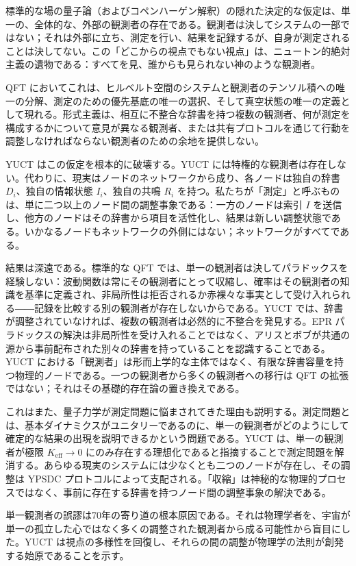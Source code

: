 \documentclass[12pt,a4paper]{article}
\begin{document}
	標準的な場の量子論（およびコペンハーゲン解釈）の隠れた決定的な仮定は、単一の、全体的な、外部の観測者の存在である。観測者は決してシステムの一部ではない；それは外部に立ち、測定を行い、結果を記録するが、自身が測定されることは決してない。この「どこからの視点でもない視点」は、ニュートン的絶対主義の遺物である：すべてを見、誰からも見られない神のような観測者。
	
	QFT においてこれは、ヒルベルト空間のシステムと観測者のテンソル積への唯一の分解、測定のための優先基底の唯一の選択、そして真空状態の唯一の定義として現れる。形式主義は、相互に不整合な辞書を持つ複数の観測者、何が測定を構成するかについて意見が異なる観測者、または共有プロトコルを通じて行動を調整しなければならない観測者のための余地を提供しない。
	
	YUCT はこの仮定を根本的に破壊する。YUCT には特権的な観測者は存在しない。代わりに、現実はノードのネットワークから成り、各ノードは独自の辞書 \(D_i\)、独自の情報状態 \(I_i\)、独自の共鳴 \(R_i\) を持つ。私たちが「測定」と呼ぶものは、単に二つ以上のノード間の調整事象である：一方のノードは索引 \(I\) を送信し、他方のノードはその辞書から項目を活性化し、結果は新しい調整状態である。いかなるノードもネットワークの外側にはない；ネットワークがすべてである。
	
	結果は深遠である。標準的な QFT では、単一の観測者は決してパラドックスを経験しない：波動関数は常にその観測者にとって収縮し、確率はその観測者の知識を基準に定義され、非局所性は拒否されるか赤裸々な事実として受け入れられる――記録を比較する別の観測者が存在しないからである。YUCT では、辞書が調整されていなければ、複数の観測者は必然的に不整合を発見する。EPR パラドックスの解決は非局所性を受け入れることではなく、アリスとボブが共通の源から事前配布された別々の辞書を持っていることを認識することである。YUCT における「観測者」は形而上学的な主体ではなく、有限な辞書容量を持つ物理的ノードである。一つの観測者から多くの観測者への移行は QFT の拡張ではない；それはその基礎的存在論の置き換えである。
	
	これはまた、量子力学が測定問題に悩まされてきた理由も説明する。測定問題とは、基本ダイナミクスがユニタリーであるのに、単一の観測者がどのようにして確定的な結果の出現を説明できるかという問題である。YUCT は、単一の観測者が極限 \(K_{\mathrm{eff}} \to 0\) にのみ存在する理想化であると指摘することで測定問題を解消する。あらゆる現実のシステムには少なくとも二つのノードが存在し、その調整は YPSDC プロトコルによって支配される。「収縮」は神秘的な物理的プロセスではなく、事前に存在する辞書を持つノード間の調整事象の解決である。
	
	単一観測者の誤謬は70年の寄り道の根本原因である。それは物理学者を、宇宙が単一の孤立した心ではなく多くの調整された観測者から成る可能性から盲目にした。YUCT は視点の多様性を回復し、それらの間の調整が物理学の法則が創発する始原であることを示す。
	
\end{document}
